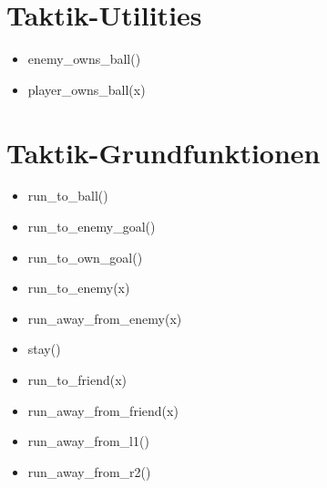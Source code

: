\section*{Taktik-Utilities}
\begin{itemize}
\item  enemy\_owns\_ball()
\item  player\_owns\_ball(x)
\end{itemize}
\section*{Taktik-Grundfunktionen}
\begin{itemize}
\item  run\_to\_ball()
\item  run\_to\_enemy\_goal()
\item  run\_to\_own\_goal()
\end{itemize}
\begin{itemize}
\item  run\_to\_enemy(x)
\item  run\_away\_from\_enemy(x)
\end{itemize}
\begin{itemize}
\item  stay()
\end{itemize}
\begin{itemize}
\item  run\_to\_friend(x)
\item  run\_away\_from\_friend(x)
\end{itemize}
\begin{itemize}
\item  run\_away\_from\_l1()
\item  run\_away\_from\_r2()
\end{itemize}
